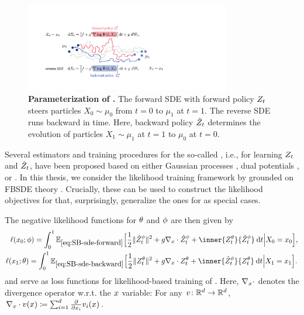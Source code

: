 \begin{figure}[t]
	\centering
	\includegraphics[width=0.8\textwidth]{figures/fig_principle_dsb.pdf}
	\caption{\textbf{Parameterization of .} The forward \acrshort{SDE} with forward policy {\color{pink} $Z_t$} steers particles $X_0 \sim \mu_0$ from $t=0$ to $\mu_1$ at $t=1$. The reverse \acrshort{SDE} runs backward in time. Here, backward policy {\color{blue} $\hat{Z}_t$} determines the evolution of particles $X_1 \sim \mu_1$ at $t=1$ to $\mu_0$ at $t=0$.} 
	\label{fig:principle_dsb}
\end{figure}

Several estimators and training procedures for the so-called , i.e., for learning $Z_t$ and $\hat{Z}_t$, have been proposed based on either Gaussian processes \citep{vargas2021solving}, dual potentials \citep{finlay2020learning}, or  \citep{de2021diffusion, chen2021likelihood}.
In this thesis, we consider the likelihood training framework by \citet{chen2021likelihood} grounded on \acrfull{FBSDE} theory \citep{ma1999forward, exarchos2018stochastic}. Crucially, these  can be used to construct the likelihood objectives for  that, surprisingly, generalize the ones for  as special cases. 

The negative likelihood functions for $\theta$ and $\phi$ are then given by
\begin{subequations}
\begin{align}
\lossb =  \int_0^\horizon \mathbb{E}_{\eqref{eq:SB-sde-forward}}\Big[ \frac{1}{2}\norm{\SBbbase^{\paramb}_\ctime}^2 &+\volatbase \Div \SBbbase^{\paramb}_\ctime+ \inner{\SBfbase^{\paramf}_\ctime}{\SBbbase^{\paramb}_\ctime} \dt \Big\vert \sde[0] = \point_0 \Big] ,  \\
\lossf =  \int_0^\horizon \mathbb{E}_{\eqref{eq:SB-sde-backward}}\Big[ \frac{1}{2}\norm{\SBfbase^{\paramf}_\ctime}^2 &+\volatbase \Div \SBfbase^{\paramf}_\ctime + \inner{\SBbbase^{\paramb}_\ctime}{\SBfbase^{\paramf}_\ctime} \dt \Big\vert \sde[\horizon] = \point_{\horizon} \Big].
\end{align}
\end{subequations}
and serve as loss functions for likelihood-based training of . Here, $\nabla_{ {x} } \cdot$ denotes the divergence operator w.r.t. the $x$ variable: For any $v\colon \mathbb{R}^d \to \mathbb{R}^d$, $\nabla_{ {x} } \cdot v(x) \coloneqq \sum_{i=1}^{d} \frac{\partial}{\partial x_{i} } v_i(x)$.


